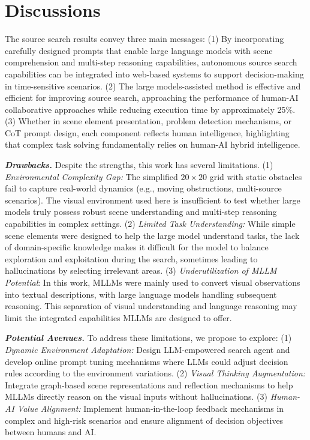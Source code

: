 \section{Discussions}

The source search results convey three main messages: (1) By incorporating carefully designed prompts that enable large language models with scene comprehension and multi-step reasoning capabilities, autonomous source search capabilities can be integrated into web-based systems to support decision-making in time-sensitive scenarios. (2) The large models-assisted method is effective and efficient for improving source search, approaching the performance of human-AI collaborative approaches while reducing execution time by approximately 25\%. (3) Whether in scene element presentation, problem detection mechanisms, or CoT prompt design, each component reflects human intelligence, highlighting that complex task solving fundamentally relies on human-AI hybrid intelligence.

\noindent\textbf{\textit{Drawbacks.}} Despite the strengths, this work has several limitations. (1) \textit{Environmental Complexity Gap:} The simplified $20 \times 20$ grid with static obstacles fail to capture real-world dynamics (e.g., moving obstructions, multi-source scenarios). The visual environment used here is insufficient to test whether large models truly possess robust scene understanding and multi-step reasoning capabilities in complex settings. (2) \textit{Limited Task Understanding:} While simple scene elements were designed to help the large model understand tasks, the lack of domain-specific knowledge makes it difficult for the model to balance exploration and exploitation during the search, sometimes leading to hallucinations by selecting irrelevant areas. (3) \textit{Underutilization of MLLM Potential}: In this work, MLLMs were mainly used to convert visual observations into textual descriptions, with large language models handling subsequent reasoning. This separation of visual understanding and language reasoning may limit the integrated capabilities MLLMs are designed to offer.

\noindent\textbf{\textit{Potential Avenues.}} To address these limitations, we propose to explore: (1) \textit{Dynamic Environment Adaptation:} Design LLM-empowered search agent and develop online prompt tuning mechanisms where LLMs could adjust decision rules according to the environment variations. (2) \textit{Visual Thinking Augmentation:} Integrate graph-based scene representations and reflection mechanisms to help MLLMs directly reason on the visual inputs without hallucinations. (3) \textit{Human-AI Value Alignment:} Implement human-in-the-loop feedback mechanisms in complex and high-risk scenarios and ensure alignment of decision objectives between humans and AI.

